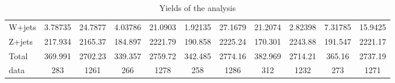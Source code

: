 \documentclass[10pt]{article}
\begin{document}
\begin{table}[htbp]
\begin{center}
\begin{tabular}{|l|S|S|S|S|S|S|S|S|S|S|}
  W+jets   & 3.78735  & 24.7877  & 4.03786  & 21.0903  & 1.92135  & 27.1679  & 21.2074  & 2.82398  & 7.31785  & 15.9425  \\ 
  Z+jets   & 217.934  & 2165.37  & 184.897  & 2221.79  & 190.858  & 2225.24  & 170.301  & 2243.88  & 191.547  & 2221.17  \\ 
\hline 
  Total  & 369.991  & 2702.23  & 339.357  & 2759.72  & 342.485  & 2774.16  & 382.969  & 2714.21  & 365.16  & 2737.19  \\ 
\hline 
  data   & 283 & 1261 & 266 & 1278 & 258 & 1286 & 312 & 1232 & 273 & 1271 \\ 
\hline 
\end{tabular} 
\caption{Yields of the analysis} 
\end{center} 
\end{table} 
\end{document}
